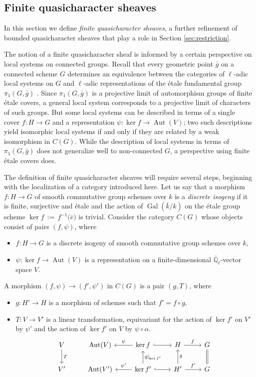 \documentclass{amsart}
\theoremstyle{plain}
\theoremstyle{definition}
\theoremstyle{remark}
\newcommand{\EE}{\mathbb{\bar Q}_\ell}
\newcommand{\bFq}{\bar{k}}
\newcommand{\Fq}{k}
\DeclareMathOperator{\Gal}{Gal}
\DeclareMathOperator{\Aut}{Aut}
\newcommand{\ceq}{{\, :=\, }}
\newcommand{\bg}{\bar{g}}
\begin{document}
\subsection{Finite quasicharacter sheaves}\label{sec:finite}

In this section we define \emph{finite quasicharacter sheaves}, a further refinement
of bounded quasicharacter sheaves that play a role in Section \ref{sec:restriction}.

The notion of a finite quasicharacter sheaf is informed
by a certain perspective on local systems on connected groups.
Recall that every geometric point $\bg$ on a connected scheme $G$
determines an equivalence between the categories of $\ell$-adic local systems on $G$
and $\ell$-adic representations of the \'etale fundamental group $\pi_1(G, \bg)$
.
 Since $\pi_1(G, \bg)$ is a projective limit of automorphism groups of finite \'etale covers,
 a general local system corresponds to a projective limit of characters of such groups.
 But some local systems can be described in terms of a single cover $f: H \to G$
 and a representation $\psi: \ker f \to \Aut(V)$;
 two such descriptions yield isomorphic local systems if and only if they are related by a weak
 isomorphism in $C(G)$.  While the description of local systems in terms of $\pi_1(G, \bg)$ does
 not generalize well to non-connected $G$, a perspective using finite \'etale covers does.

The definition of finite quasicharacter sheaves will require several steps,
beginning with the localization of a category introduced here.
Let us say that a morphism $f : H\to G$ of smooth commutative group schemes over $\Fq$ is a \emph{discrete isogeny}
if it is finite, surjective and \'etale and the action of $\Gal(\bFq/\Fq)$ on the \'etale group
scheme $\ker f \ceq f^{-1}({\bar e)}$ is trivial.
Consider the category $C(G)$ whose objects consist of pairs $(f,\psi)$, where
\begin{itemize}
\item $f : H\to G$ is a discrete isogeny of smooth commutative group schemes over $\Fq$,
\item $\psi : \ker f\to \Aut(V)$ is a representation on a finite-dimensional $\EE$-vector space $V$.
\end{itemize}
A morphism $(f,\psi) \to (f',\psi')$ in $C(G)$ is a pair $(g,T)$, where
\begin{itemize}
\item $g : H' \to H$ is a morphism of schemes such that $f' = f\circ g$,
\item $T : V\to V'$ is a linear transformation, equivariant for the action of
$\ker f'$ on $V'$ by $\psi'$ and the action of $\ker f'$ on $V$ by $\psi \circ \alpha$.
\[
\begin{tikzcd}
V \arrow{d}{T} & \Aut(V) & \arrow[swap]{l}{\psi} \ker f \arrow[hook]{r} & H \arrow{r}{f} & \arrow[equal]{d} G\\
V' & \Aut(V') & \arrow[swap]{l}{\psi'} \arrow[swap]{u}{g\vert_{\ker f'}} \ker f' \arrow[hook]{r} & \arrow[swap]{u}{g} H' \arrow{r}{f'} & G
\end{tikzcd}
\]
\end{itemize}
\end{document}
